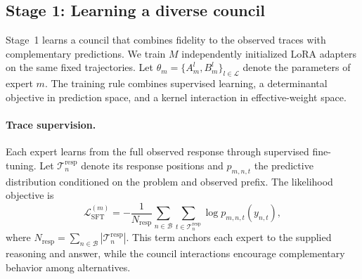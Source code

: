 \documentclass[11pt,twocolumn]{article}
\newcommand{\Tset}{\mathcal{T}}
\newcommand{\Lcal}{\mathcal{L}}
\newcommand{\Bcal}{\mathcal{B}}
\begin{document}
\subsection{Stage 1: Learning a diverse council}
\label{sec:stage1}

Stage~1 learns a council that combines fidelity to the observed traces with
complementary predictions. We train $M$ independently initialized LoRA
adapters on the same fixed trajectories. Let
$\theta_m=\{A_m^l,B_m^l\}_{l\in\Lcal}$ denote the parameters of expert $m$.
The training rule combines supervised learning, a determinantal objective in
prediction space, and a kernel interaction in effective-weight space.

\paragraph{Trace supervision.}
Each expert learns from the full observed response through supervised
fine-tuning. Let $\Tset_n^{\mathrm{resp}}$ denote its response positions and
$p_{m,n,t}$ the predictive distribution conditioned on the problem and
observed prefix. The likelihood objective is
\begin{equation}
 \Lcal_{\mathrm{SFT}}^{(m)}=
 -\frac{1}{N_{\mathrm{resp}}}
 \sum_{n\in\Bcal}\sum_{t\in\Tset_n^{\mathrm{resp}}}
 \log p_{m,n,t}(y_{n,t}),
 \label{eq:sft1}
\end{equation}
where $N_{\mathrm{resp}}=\sum_{n\in\Bcal}|\Tset_n^{\mathrm{resp}}|$.
This term anchors each expert to the supplied reasoning and answer, while the
council interactions encourage complementary behavior among alternatives.
\end{document}

